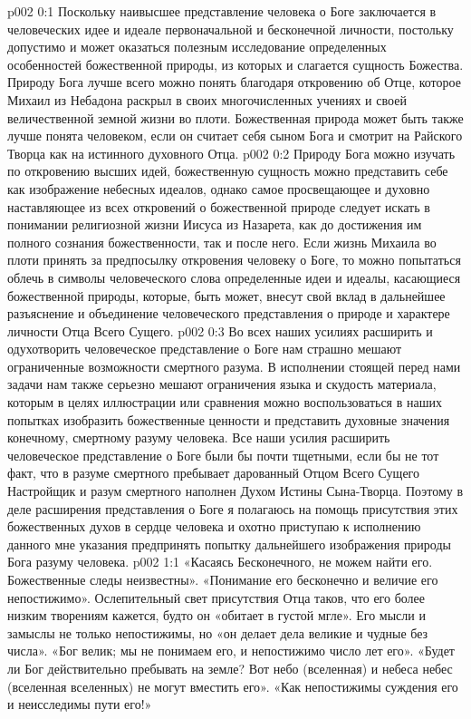 \author{Божественный Советник}
\vs p002 0:1 Поскольку наивысшее представление человека о Боге заключается в человеческих идее и идеале первоначальной и бесконечной личности, постольку допустимо и может оказаться полезным исследование определенных особенностей божественной природы, из которых и слагается сущность Божества. Природу Бога лучше всего можно понять благодаря откровению об Отце, которое Михаил из Небадона раскрыл в своих многочисленных учениях и своей величественной земной жизни во плоти. Божественная природа может быть также лучше понята человеком, если он считает себя сыном Бога и смотрит на Райского Творца как на истинного духовного Отца.
\vs p002 0:2 Природу Бога можно изучать по откровению высших идей, божественную сущность можно представить себе как изображение небесных идеалов, однако самое просвещающее и духовно наставляющее из всех откровений о божественной природе следует искать в понимании религиозной жизни Иисуса из Назарета, как до достижения им полного сознания божественности, так и после него. Если жизнь Михаила во плоти принять за предпосылку откровения человеку о Боге, то можно попытаться облечь в символы человеческого слова определенные идеи и идеалы, касающиеся божественной природы, которые, быть может, внесут свой вклад в дальнейшее разъяснение и объединение человеческого представления о природе и характере личности Отца Всего Сущего.
\vs p002 0:3 Во всех наших усилиях расширить и одухотворить человеческое представление о Боге нам страшно мешают ограниченные возможности смертного разума. В исполнении стоящей перед нами задачи нам также серьезно мешают ограничения языка и скудость материала, которым в целях иллюстрации или сравнения можно воспользоваться в наших попытках изобразить божественные ценности и представить духовные значения конечному, смертному разуму человека. Все наши усилия расширить человеческое представление о Боге были бы почти тщетными, если бы не тот факт, что в разуме смертного пребывает дарованный Отцом Всего Сущего Настройщик и разум смертного наполнен Духом Истины Сына\hyp{}Творца. Поэтому в деле расширения представления о Боге я полагаюсь на помощь присутствия этих божественных духов в сердце человека и охотно приступаю к исполнению данного мне указания предпринять попытку дальнейшего изображения природы Бога разуму человека.
\vs p002 1:1 «Касаясь Бесконечного, не можем найти его. Божественные следы неизвестны». «Понимание его бесконечно и величие его непостижимо». Ослепительный свет присутствия Отца таков, что его более низким творениям кажется, будто он «обитает в густой мгле». Его мысли и замыслы не только непостижимы, но «он делает дела великие и чудные без числа». «Бог велик; мы не понимаем его, и непостижимо число лет его». «Будет ли Бог действительно пребывать на земле? Вот небо (вселенная) и небеса небес (вселенная вселенных) не могут вместить его». «Как непостижимы суждения его и неисследимы пути его!»
